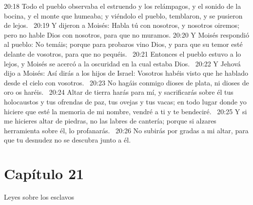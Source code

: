 20:18 Todo el pueblo observaba el estruendo y los relámpagos, y el sonido de la bocina, y el monte que humeaba; y viéndolo el pueblo, temblaron, y se pusieron de lejos.  
20:19 Y dijeron a Moisés: Habla tú con nosotros, y nosotros oiremos; pero no hable Dios con nosotros, para que no muramos. 
20:20 Y Moisés respondió al pueblo: No temáis; porque para probaros vino Dios, y para que su temor esté delante de vosotros, para que no pequéis.  
20:21 Entonces el pueblo estuvo a lo lejos, y Moisés se acercó a la oscuridad en la cual estaba Dios.  
20:22 Y Jehová dijo a Moisés: Así dirás a los hijos de Israel: Vosotros habéis visto que he hablado desde el cielo con vosotros.  
20:23 No hagáis conmigo dioses de plata, ni dioses de oro os haréis.  
20:24 Altar de tierra harás para mí, y sacrificarás sobre él tus holocaustos y tus ofrendas de paz, tus ovejas y tus vacas; en todo lugar donde yo hiciere que esté la memoria de mi nombre, vendré a ti y te bendeciré.  
20:25 Y si me hicieres altar de piedras, no las labres de cantería; porque si alzares herramienta sobre él, lo profanarás.  
20:26 No subirás por gradas a mi altar, para que tu desnudez no se descubra junto a él. 

\section*{Capítulo 21}
Leyes sobre los esclavos 


